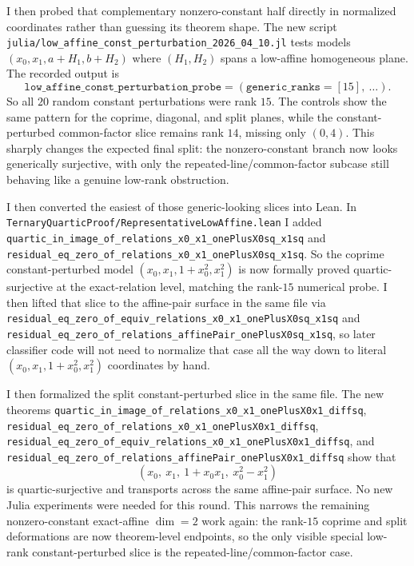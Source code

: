 \documentclass[11pt]{article}
\begin{document}
I then probed that complementary nonzero-constant half directly in normalized
coordinates rather than guessing its theorem shape. The new script
\texttt{julia/low\_affine\_const\_perturbation\_2026\_04\_10.jl} tests models
\((x_0, x_1, a + H_1, b + H_2)\) where \((H_1,H_2)\) spans a low-affine
homogeneous plane. The recorded output is
\[
\texttt{low\_affine\_const\_perturbation\_probe}
  = (\texttt{generic\_ranks}=[15],\ \dots).
\]
So all \(20\) random constant perturbations were rank \(15\). The controls show
the same pattern for the coprime, diagonal, and split planes, while the
constant-perturbed common-factor slice remains rank \(14\), missing only
\((0,4)\). This sharply changes the expected final split: the nonzero-constant
branch now looks generically surjective, with only the repeated-line/common-factor
subcase still behaving like a genuine low-rank obstruction.

I then converted the easiest of those generic-looking slices into Lean. In
\texttt{TernaryQuarticProof/RepresentativeLowAffine.lean} I added
\texttt{quartic\_in\_image\_of\_relations\_x0\_x1\_onePlusX0sq\_x1sq} and
\texttt{residual\_eq\_zero\_of\_relations\_x0\_x1\_onePlusX0sq\_x1sq}. So the
coprime constant-perturbed model \((x_0, x_1, 1 + x_0^2, x_1^2)\) is now
formally proved quartic-surjective at the exact-relation level, matching the
rank-\(15\) numerical probe. I then lifted that slice to the affine-pair
surface in the same file via
\texttt{residual\_eq\_zero\_of\_equiv\_relations\_x0\_x1\_onePlusX0sq\_x1sq}
and
\texttt{residual\_eq\_zero\_of\_relations\_affinePair\_onePlusX0sq\_x1sq}, so
later classifier code will not need to normalize that case all the way down to
literal \((x_0, x_1, 1 + x_0^2, x_1^2)\) coordinates by hand.

I then formalized the split constant-perturbed slice in the same file. The new
theorems
\texttt{quartic\_in\_image\_of\_relations\_x0\_x1\_onePlusX0x1\_diffsq},
\texttt{residual\_eq\_zero\_of\_relations\_x0\_x1\_onePlusX0x1\_diffsq},
\texttt{residual\_eq\_zero\_of\_equiv\_relations\_x0\_x1\_onePlusX0x1\_diffsq},
and
\texttt{residual\_eq\_zero\_of\_relations\_affinePair\_onePlusX0x1\_diffsq}
show that
\[
  (x_0,\ x_1,\ 1 + x_0x_1,\ x_0^2 - x_1^2)
\]
is quartic-surjective and transports across the same affine-pair surface. No
new Julia experiments were needed for this round. This narrows the remaining
nonzero-constant exact-affine \(\dim=2\) work again: the rank-\(15\) coprime
and split deformations are now theorem-level endpoints, so the only visible
special low-rank constant-perturbed slice is the repeated-line/common-factor
case.
\end{document}
